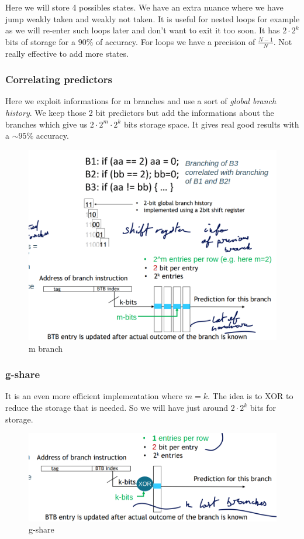 \documentclass{report}
\begin{document}
Here we will store 4 possibles states. We have an extra nuance where we have jump weakly taken and weakly not taken. It is useful for nested loops for example as we will re-enter such loops later and don't want to exit it too soon. It has $2 \cdot 2^k$ bits of storage for a $90\%$ of accuracy. For loops we have a precision of $\frac{N-1}{N}$. Not really effective to add more states.

\subsubsection{Correlating predictors}

Here we exploit informations for m branches and use a sort of \textit{global branch history}. We keep those 2 bit predictors but add the informations about the branches which give us $2 \cdot 2^m \cdot 2^k$ bits storage space. It gives real good results with a $\sim 95\%$ accuracy.

\begin{figure}[H]
    \centering
    \includegraphics[width=0.5\linewidth]{BHT_m_branch.png}
    \caption{m branch}
    \label{fig:enter-label}
\end{figure}

\subsubsection{g-share}

It is an even more efficient implementation where $m=k$. The idea is to XOR to reduce the storage that is needed. So we will have just around $2 \cdot 2^k$ bits for storage.

\begin{figure}[H]
    \centering
    \includegraphics[width=0.5\linewidth]{gshare.png}
    \caption{g-share}
    \label{fig:enter-label}
\end{figure}
\end{document}
